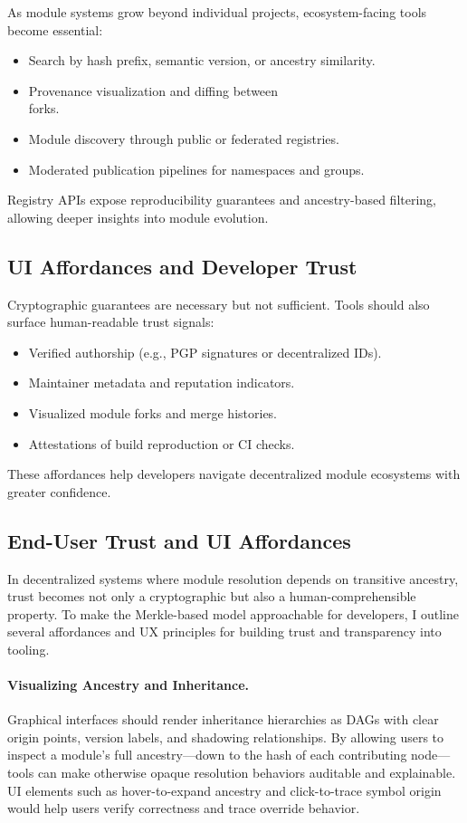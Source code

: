 \documentclass[sigplan,screen]{acmart}
\begin{document}
As module systems grow beyond individual projects, ecosystem-facing tools become essential:
\begin{itemize}
	\item Search by hash prefix, semantic version, or ancestry similarity.
	\item Provenance visualization and diffing between \\forks.
	\item Module discovery through public or federated registries.
	\item Moderated publication pipelines for namespaces and groups.
\end{itemize}

Registry APIs expose reproducibility guarantees and ancestry-based filtering, allowing deeper insights into module evolution.

\subsection{UI Affordances and Developer Trust}

Cryptographic guarantees are necessary but not sufficient. Tools should also surface human-readable trust signals:

\begin{itemize}
	\item Verified authorship (e.g., PGP signatures or decentralized IDs).
	\item Maintainer metadata and reputation indicators.
	\item Visualized module forks and merge histories.
	\item Attestations of build reproduction or CI checks.
\end{itemize}

These affordances help developers navigate decentralized module ecosystems with greater confidence.

\subsection{End-User Trust and UI Affordances}
\label{sec:trust-ui}

In decentralized systems where module resolution depends on transitive ancestry, trust becomes not only a cryptographic but also a human-comprehensible property. To make the Merkle-based model approachable for developers, I outline several affordances and UX principles for building trust and transparency into tooling.

\paragraph{Visualizing Ancestry and Inheritance.}
Graphical interfaces should render inheritance hierarchies as DAGs with clear origin points, version labels, and shadowing relationships. By allowing users to inspect a module's full ancestry—down to the hash of each contributing node—tools can make otherwise opaque resolution behaviors auditable and explainable. UI elements such as hover-to-expand ancestry and click-to-trace symbol origin would help users verify correctness and trace override behavior.
\end{document}

